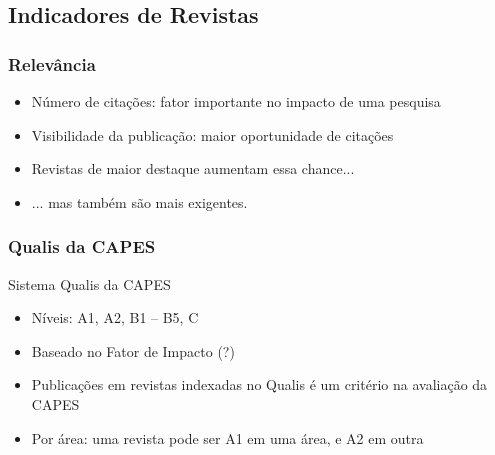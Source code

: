 \documentclass{beamer}
\begin{document}



\subsection{Indicadores de Revistas}

\subsubsection{Relevância}

\begin{frame}
  \begin{itemize}
    \footnotesize
  \item Número de citações: fator importante no impacto de uma pesquisa
    \bigskip
  \item Visibilidade da publicação: maior oportunidade de citações
    \bigskip
  \item Revistas de maior destaque aumentam essa chance...
    \bigskip
  \item ... mas também são mais exigentes.
  \end{itemize}
\end{frame}

\subsubsection{Qualis da CAPES}

\begin{frame}{Sistema Qualis da CAPES}
  \begin{itemize}
    \footnotesize
  \item Níveis: A1, A2, B1 -- B5, C
    \bigskip
  \item Baseado no Fator de Impacto (?)
    \bigskip
  \item Publicações em revistas indexadas no Qualis é um critério na avaliação da CAPES
    \bigskip
  \item Por área: uma revista pode ser A1 em uma área, e A2 em outra
  \end{itemize}
\end{frame}
\end{document}
